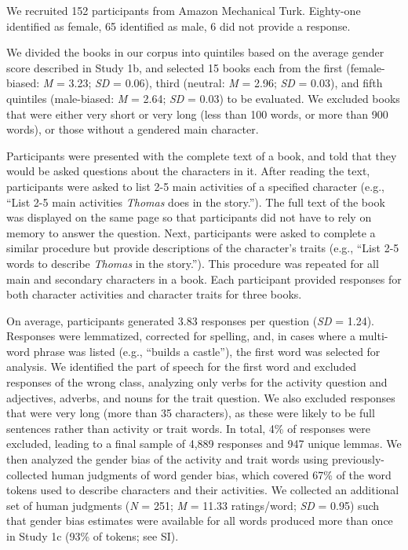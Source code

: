 \documentclass[
  english,
  ,man,floatsintext]{apa6}
\begin{document}
We recruited 152 participants from Amazon Mechanical Turk. Eighty-one identified as female, 65 identified as male, 6 did not provide a response.

We divided the books in our corpus into quintiles based on the average gender score described in Study 1b, and selected 15 books each from the first (female-biased: \emph{M} = 3.23; \emph{SD} = 0.06), third (neutral: \emph{M} = 2.96; \emph{SD} = 0.03), and fifth quintiles (male-biased: \emph{M} = 2.64; \emph{SD} = 0.03) to be evaluated. We excluded books that were either very short or very long (less than 100 words, or more than 900 words), or those without a gendered main character.

Participants were presented with the complete text of a book, and told that they would be asked questions about the characters in it. After reading the text, participants were asked to list 2-5 main activities of a specified character (e.g., ``List 2-5 main activities \emph{Thomas} does in the story.''). The full text of the book was displayed on the same page so that participants did not have to rely on memory to answer the question. Next, participants were asked to complete a similar procedure but provide descriptions of the character's traits (e.g., ``List 2-5 words to describe \emph{Thomas} in the story.''). This procedure was repeated for all main and secondary characters in a book. Each participant provided responses for both character activities and character traits for three books.

On average, participants generated 3.83 responses per question (\emph{SD} = 1.24). Responses were lemmatized, corrected for spelling, and, in cases where a multi-word phrase was listed (e.g., ``builds a castle''), the first word was selected for analysis. We identified the part of speech for the first word and excluded responses of the wrong class, analyzing only verbs for the activity question and adjectives, adverbs, and nouns for the trait question. We also excluded responses that were very long (more than 35 characters), as these were likely to be full sentences rather than activity or trait words. In total, 4\% of responses were excluded, leading to a final sample of 4,889 responses and 947 unique lemmas. We then analyzed the gender bias of the activity and trait words using previously-collected human judgments of word gender bias, which covered 67\% of the word tokens used to describe characters and their activities. We collected an additional set of human judgments (\emph{N} = 251; \emph{M} = 11.33 ratings/word; \emph{SD} = 0.95) such that gender bias estimates were available for all words produced more than once in Study 1c (93\% of tokens; see SI).
\end{document}
